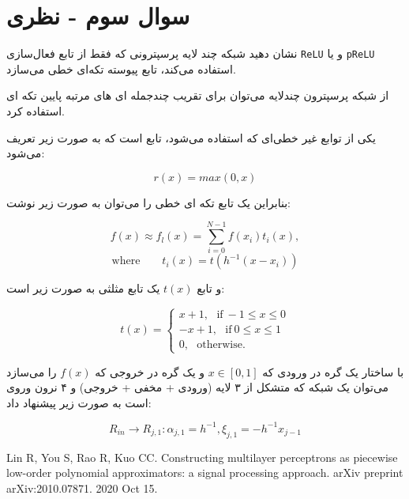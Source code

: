 \section{سوال سوم - نظری}

نشان دهید شبکه چند لایه پرسپترونی که فقط از تابع فعال‌سازی \texttt{ReLU} و یا \texttt{pReLU} استفاده می‌کند، تابع پیوسته تکه‌ای خطی می‌سازد.


\begin{qsolve}
از شبکه پرسپترون چند‌لایه می‌توان برای تقریب چند‌جمله ای های مرتبه پایین تکه ای استفاده کرد. \cite{ref1}

یکی از توابع غیر خطی‌ای که استفاده می‌شود، تابع  است که به صورت زیر تعریف می‌شود:

	$$ r(x)=max(0, x) $$
	
	بنابراین یک تابع تکه ای خطی را می‌توان به صورت زیر نوشت:
	
	$$ f(x)\approx f_l(x)=\sum_{i=0}^{N-1} f(x_i)t_i(x), $$
	$$ \text{where} \qquad t_i(x)=t(h^{-1}(x-x_i)) $$
	
	و تابع $t(x)$ یک تابع مثلثی به صورت زیر است:
	
	$$
	t(x)=
	\begin{cases}
		x+1, \ \ \  \text{if} \ -1\le x \le 0 \\
		-x+1, \ \ \ \text{if} \ 0\le x \le 1 \\
		0,     \ \ \ \text{otherwise.}
	\end{cases}
	$$
	
	با ساختار یک گره در ورودی که $x \in [0,1]$ و یک گره در خروجی که $f(x)$ را می‌سازد می‌توان یک شبکه  که متشکل از ۳ لایه (ورودی + مخفی + خروجی) و ۴ نرون وروی است به صورت زیر پیشنهاد داد:
	
	$$
		R_{in} \rightarrow R_{j, 1}: \alpha_{j, 1}=h^{-1}, \xi_{j,1}=-h^{-1}x_{j-1}
	$$
	
\end{qsolve}

















\begin{latin}
	\begin{thebibliography}{9}
		Lin R, You S, Rao R, Kuo CC. Constructing multilayer perceptrons as piecewise low-order polynomial approximators: a signal processing approach. arXiv preprint arXiv:2010.07871. 2020 Oct 15.	
	\end{thebibliography} 
\end{latin}










